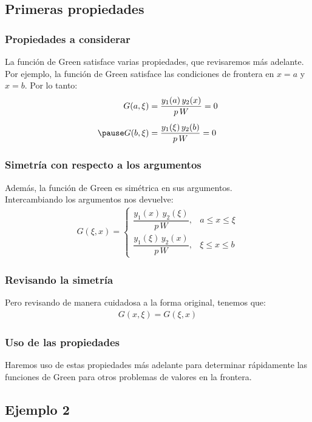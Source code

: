 \documentclass[12pt]{beamer}
\begin{document}
\subsection{Primeras propiedades}

\begin{frame}
\frametitle{Propiedades a considerar}
La función de Green satisface varias propiedades, que revisaremos más adelante.
\\
\bigskip
\pause
Por ejemplo, la función de Green satisface las condiciones de frontera en $x = a$ y $x = b$. Por lo tanto:
\pause
\begin{eqnarray*}
G (a, \xi) &= \dfrac{y_{1} (a) \, y_{2} (x)}{p \, W} = 0 \\[0.5em] \pause
G (b, \xi) &= \dfrac{y_{1} (\xi) \, y_{2} (b)}{p \, W} = 0
\end{eqnarray*}
\end{frame}

\begin{frame}
\frametitle{Simetría con respecto a los argumentos}
Además, la función de Green es simétrica en sus argumentos.
\\
\bigskip
\pause
Intercambiando los argumentos nos devuelve:
\pause
\begin{align}
G (\xi, x) = \begin{cases}
\dfrac{y_{1} (x) \, y_{2} (\xi)}{p \, W}, & a \leq x \leq \xi \\[1em]
\dfrac{y_{1} (\xi) \, y_{2} (x)}{p \, W}, & \xi \leq x \leq b
\end{cases}
\label{eq:ecuacion_07_34}
\end{align}
\end{frame}

\begin{frame}
\frametitle{Revisando la simetría}
Pero revisando de manera cuidadosa a la forma original, tenemos que:
\pause
\begin{align*}
G (x, \xi) = G (\xi, x)
\end{align*}
\end{frame}

\begin{frame}
\frametitle{Uso de las propiedades}
Haremos uso de estas propiedades más adelante para determinar rápidamente las funciones de Green para otros problemas de valores en la frontera.
\end{frame}

\subsection*{Ejemplo 2}
\end{document}
